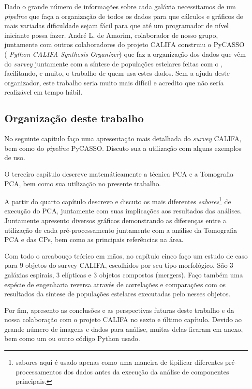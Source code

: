Dado o grande número de informações sobre cada galáxia necessitamos de um {\em
pipeline} que faça a organização de todos os dados para que cálculos e gráficos
de mais variadas dificuldade sejam fácil para que até um programador de nível
iniciante possa fazer. André L. de Amorim, colaborador de nosso grupo,
juntamente com outros colaboradores do projeto CALIFA construiu o PyCASSO ({\em
Python CALIFA \starlight Synthesis Organizer}) \citep{CidFernandes2013a} que
faz a organização dos dados que vêm do {\em survey} juntamente com a síntese de
populações estelares feitas com o \starlight, facilitando, e muito, o trabalho
de quem usa estes dados. Sem a ajuda deste organizador, este trabalho seria
muito mais difícil e acredito que não sería realizável em tempo hábil.

\subsection{Organização deste trabalho}

No seguinte capítulo faço uma apresentação mais detalhada do {\em survey}
CALIFA, bem como do {\em pipeline} PyCASSO. Discuto sua a utilização com alguns
exemplos de uso.

O terceiro capítulo descreve matemáticamente a técnica PCA e a Tomografia PCA,
bem como sua utilização no presente trabalho. 

A partir do quarto capítulo descrevo e discuto os mais diferentes {\em
sabores}\footnote{sabores aqui é usado apenas como uma maneira de tipificar
diferentes pré-processamentos dos dados antes da execução da análise de
componentes principais.} de execução do PCA, juntamente com suas implicações aos
resultados das análises. Juntamente apresento diversos gráficos demonstrando as
diferenças entre a utilização de cada pré-processamento juntamente com a análise
da Tomografia PCA e das CPs, bem como as principais referências na área.

Com todo o arcabouço teórico em mãos, no capítulo cinco faço um estudo de caso
para $9$ objetos do survey CALIFA, escolhidos por seu tipo morfológico. São $3$
galáxias espirais, $3$ elípticas e $3$ objetos compostos (mergers). Faço também
uma espécie de engenharia reversa através de correlações e comparações com os
resultados da síntese de populações estelares executadas pelo \starlight nesses
objetos.

Por fim, apresento as conclusões e as perspectivas futuras deste trabalho e da
nossa colaboração com o projeto CALIFA no sexto e último capítulo. Devido ao
grande número de imagens e dados para análise, muitas delas ficaram em anexo,
bem como um ou outro código Python usado.

